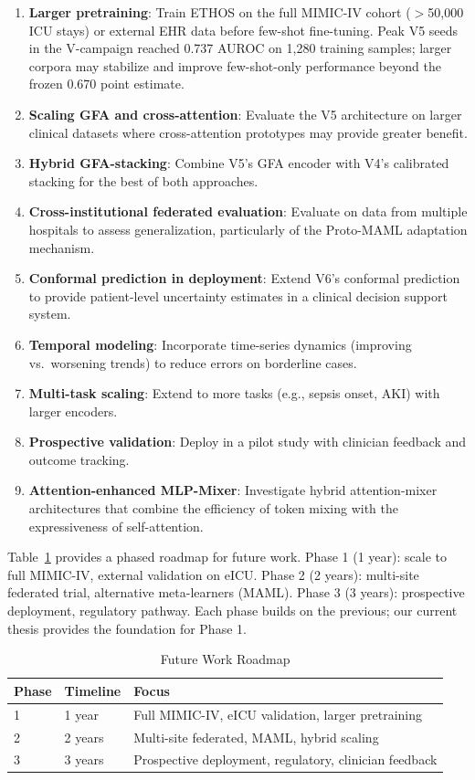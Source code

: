 \begin{enumerate}
\item \textbf{Larger pretraining}: Train ETHOS on the full MIMIC-IV cohort ($>$50,000 ICU stays) or external EHR data before few-shot fine-tuning. Peak V5 seeds in the V-campaign reached 0.737 AUROC on 1,280 training samples; larger corpora may stabilize and improve few-shot-only performance beyond the frozen 0.670 point estimate.
\item \textbf{Scaling GFA and cross-attention}: Evaluate the V5 architecture on larger clinical datasets where cross-attention prototypes may provide greater benefit.
\item \textbf{Hybrid GFA-stacking}: Combine V5's GFA encoder with V4's calibrated stacking for the best of both approaches.
\item \textbf{Cross-institutional federated evaluation}: Evaluate on data from multiple hospitals to assess generalization, particularly of the Proto-MAML adaptation mechanism.
\item \textbf{Conformal prediction in deployment}: Extend V6's conformal prediction to provide patient-level uncertainty estimates in a clinical decision support system.
\item \textbf{Temporal modeling}: Incorporate time-series dynamics (improving vs.\ worsening trends) to reduce errors on borderline cases.
\item \textbf{Multi-task scaling}: Extend to more tasks (e.g., sepsis onset, AKI) with larger encoders.
\item \textbf{Prospective validation}: Deploy in a pilot study with clinician feedback and outcome tracking.
\item \textbf{Attention-enhanced MLP-Mixer}: Investigate hybrid attention-mixer architectures that combine the efficiency of token mixing with the expressiveness of self-attention.
\end{enumerate}

Table~\ref{tab:future_roadmap} provides a phased roadmap for future work. Phase 1 (1 year): scale to full MIMIC-IV, external validation on eICU. Phase 2 (2 years): multi-site federated trial, alternative meta-learners (MAML). Phase 3 (3 years): prospective deployment, regulatory pathway. Each phase builds on the previous; our current thesis provides the foundation for Phase 1.

\begin{table}[htbp]
\centering
\caption{Future Work Roadmap}
\small
\begin{tabular}{llp{6cm}}
\toprule
\textbf{Phase} & \textbf{Timeline} & \textbf{Focus} \\
\midrule
1 & 1 year & Full MIMIC-IV, eICU validation, larger pretraining \\
2 & 2 years & Multi-site federated, MAML, hybrid scaling \\
3 & 3 years & Prospective deployment, regulatory, clinician feedback \\
\bottomrule
\end{tabular}
\label{tab:future_roadmap}
\end{table}

